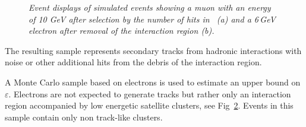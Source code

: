\begin{figure}[H]
\begin{subfigure}{0.5\textwidth}
		\caption{\label{fig:esys}}
	\end{subfigure}
	\caption{ \sl Event displays of simulated events showing a muon with an energy of 10 GeV after selection by the number of hits in \ecal\ \textit{(a)} and a 6\,GeV electron after removal of the interaction region \textit{(b)}.}
\end{figure}
The resulting sample represents secondary tracks from hadronic interactions with noise or other additional hits from the debris of the interaction region. 

A Monte Carlo sample based on electrons is used to estimate an upper bound on $\varepsilon$. Electrons are not expected to generate tracks but rather only an interaction region accompanied  by low energetic satellite clusters, see Fig~\ref{fig:esys}. Events in this sample contain only non track-like clusters. 
